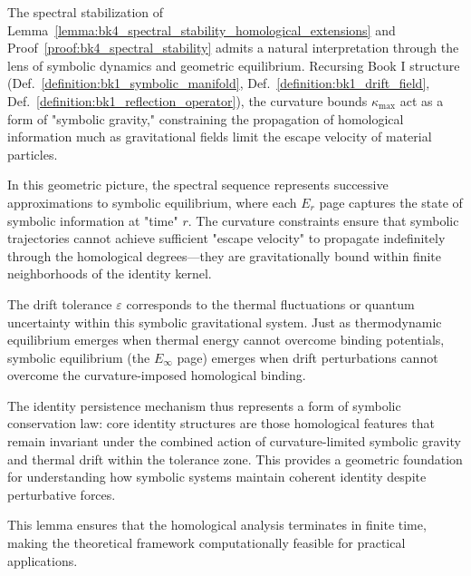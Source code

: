 \begin{scholium}
\label{scholium:bk4_towards_symbolic_equilibrium}
The spectral stabilization of Lemma~\ref{lemma:bk4_spectral_stability_homological_extensions} and Proof~\ref{proof:bk4_spectral_stability} admits a natural interpretation through the lens of symbolic dynamics and geometric equilibrium. Recursing Book I structure (Def.~\ref{definition:bk1_symbolic_manifold}, Def.~\ref{definition:bk1_drift_field}, Def.~\ref{definition:bk1_reflection_operator}), the curvature bounds $\kappa_{\max}$ act as a form of "symbolic gravity," constraining the propagation of homological information much as gravitational fields limit the escape velocity of material particles.

In this geometric picture, the spectral sequence represents successive approximations to symbolic equilibrium, where each $E_r$ page captures the state of symbolic information at "time" $r$. The curvature constraints ensure that symbolic trajectories cannot achieve sufficient "escape velocity" to propagate indefinitely through the homological degrees---they are gravitationally bound within finite neighborhoods of the identity kernel.

The drift tolerance $\varepsilon$ corresponds to the thermal fluctuations or quantum uncertainty within this symbolic gravitational system. Just as thermodynamic equilibrium emerges when thermal energy cannot overcome binding potentials, symbolic equilibrium (the $E_\infty$ page) emerges when drift perturbations cannot overcome the curvature-imposed homological binding.

The identity persistence mechanism thus represents a form of symbolic conservation law: core identity structures are those homological features that remain invariant under the combined action of curvature-limited symbolic gravity and thermal drift within the tolerance zone. This provides a geometric foundation for understanding how symbolic systems maintain coherent identity despite perturbative forces.
\end{scholium}

This lemma ensures that the homological analysis terminates in finite time, making the theoretical framework computationally feasible for practical applications.

